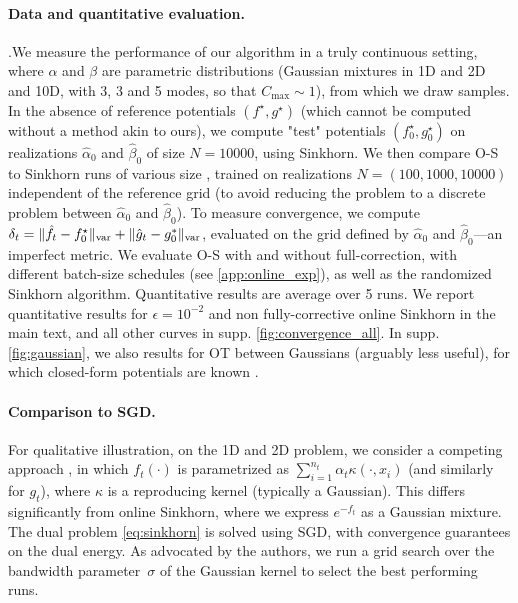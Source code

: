 \paragraph{Data and quantitative evaluation.}\label{sec:online_exp}.We measure the performance of our algorithm in a
truly continuous setting, where $\alpha$ and $\beta$ are  parametric
distributions (Gaussian mixtures in 1D and 2D and 10D, with 3, 3 and 5 modes, so
that $C_{\max} \sim 1$), from which we draw samples. In the absence of reference
potentials $(f^\star, g^\star)$ (which cannot be computed without a method akin
to ours), we compute "test" potentials $(f^\star_0, g^\star_0)$ on realizations $\hat
\alpha_0$ and $\hat \beta_0$ of size $N=10000$, using Sinkhorn. We then compare
O-S to Sinkhorn runs of various size , trained on realizations $N=(100,1000,
10000)$ independent of the reference grid (to avoid reducing the problem to a
discrete problem between $\hat \alpha_0$ and $\hat \beta_0$). To measure
convergence, we compute $\delta_t = \Vert \hat f_t - f^\star_0 \Vert_{\text{\upshape var}} +
\Vert \hat g_t - g_0^* \Vert_{\text{\upshape var}}$, evaluated on the grid defined by
$\hat \alpha_0$ and $\hat \beta_0$---an imperfect metric. We evaluate O-S with and without full-correction, with
different batch-size schedules (see \autoref{app:online_exp}), as well as the randomized Sinkhorn algorithm. Quantitative results are average over 5 runs. We report quantitative results for $\epsilon = 10^{-2}$ and non fully-corrective online Sinkhorn in the main text, and all other curves in supp. \autoref{fig:convergence_all}. In
supp. \autoref{fig:gaussian}, we also results for OT between Gaussians (arguably less useful), for which closed-form
potentials are known \cite{janati_entropic_2020}.

\paragraph{Comparison to SGD.}\label{sec:compare}
%
For qualitative illustration, on the 1D and 2D problem, we consider a competing
approach \citep{2016-genevay-nips}, in which $f_t(\cdot)$ is parametrized as
$\sum_{i=1}^{n_t} \alpha_t \kappa(\cdot, x_i)$ (and similarly for $g_t$), where
$\kappa$ is a reproducing kernel (typically a Gaussian). This differs
significantly from online Sinkhorn, where we express $e^{-f_t}$ as a Gaussian
mixture. The dual problem \eqref{eq:sinkhorn} is solved using SGD, with convergence guarantees on the dual energy.  As advocated
by the authors, we run a grid search over the bandwidth parameter~$\sigma$ of
the Gaussian kernel to select the best performing runs. 


